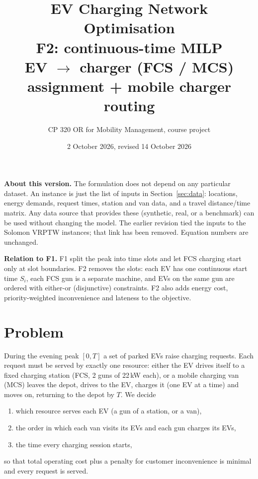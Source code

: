 \documentclass[11pt,a4paper]{article}
\title{\textbf{EV Charging Network Optimisation}\\[3pt]
\large F2: continuous-time MILP\\[2pt]
\normalsize EV $\rightarrow$ charger (FCS / MCS) assignment + mobile charger routing}
\author{CP 320 OR for Mobility Management, course project}
\date{2 October 2026, revised 14 October 2026}
\begin{document}
\maketitle

\textbf{About this version.} The formulation does not depend on any particular dataset. An instance is just the list of inputs in Section~\ref{sec:data}: locations, energy demands, request times, station and van data, and a travel distance/time matrix. Any data source that provides these (synthetic, real, or a benchmark) can be used without changing the model. The earlier revision tied the inputs to the Solomon VRPTW instances; that link has been removed. Equation numbers are unchanged.

\textbf{Relation to F1.} F1 split the peak into time slots and let FCS charging start only at slot boundaries. F2 removes the slots: each EV has one continuous start time $S_i$, each FCS gun is a separate machine, and EVs on the same gun are ordered with either-or (disjunctive) constraints. F2 also adds energy cost, priority-weighted inconvenience and lateness to the objective.

\section{Problem}

During the evening peak $[0,T]$ a set of parked EVs raise charging requests. Each request must be served by exactly one resource: either the EV drives itself to a fixed charging station (FCS, 2 guns of 22\,kW each), or a mobile charging van (MCS) leaves the depot, drives to the EV, charges it (one EV at a time) and moves on, returning to the depot by $T$. We decide
\begin{enumerate}[leftmargin=1.6em,itemsep=1pt]
  \item which resource serves each EV (a gun of a station, or a van),
  \item the order in which each van visits its EVs and each gun charges its EVs,
  \item the time every charging session starts,
\end{enumerate}
so that total operating cost plus a penalty for customer inconvenience is minimal and every request is served.

\end{document}
